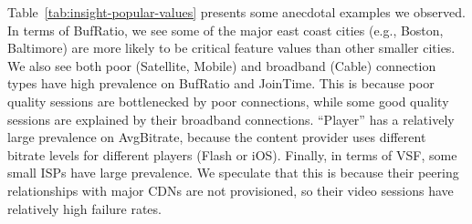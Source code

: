 Table~\ref{tab:insight-popular-values} presents some
anecdotal examples we observed.  
In terms of BufRatio, we see some of the major east 
coast cities (e.g., Boston, Baltimore) are more likely to be 
critical feature values than other smaller cities.  
We also see both poor (Satellite, Mobile) and broadband 
(Cable) connection types have high prevalence on 
BufRatio and JoinTime.  
This is because poor quality sessions are bottlenecked 
by poor connections, while some good quality sessions 
are explained by their broadband connections.  
``Player'' has a relatively large prevalence on AvgBitrate, 
because the content provider uses different  bitrate levels 
for different players (Flash or iOS).  
Finally, in terms of VSF, some small ISPs have large 
prevalence.  We speculate that this is because
their peering relationships with major CDNs are not 
provisioned, so their video sessions have relatively 
high failure rates.


